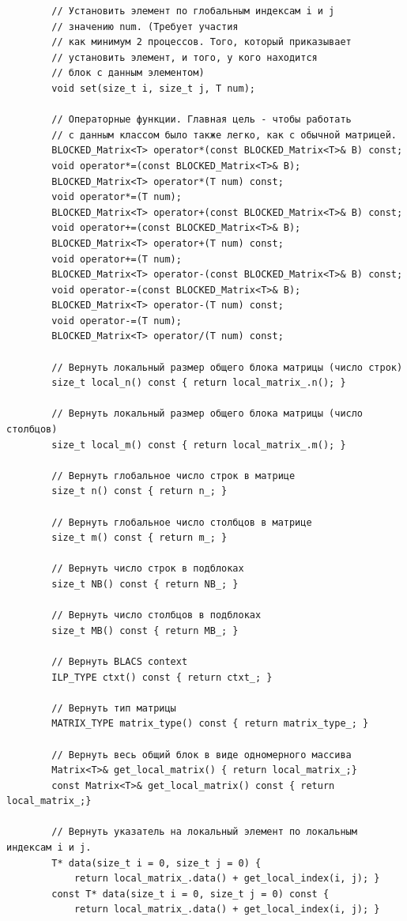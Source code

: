 \documentclass[12pt,fleqn]{article}
\begin{document}
\begin{mdframed}[linecolor=black, topline=true, bottomline=true,
            leftline=false, rightline=false]
\begin{verbatim}
        // Установить элемент по глобальным индексам i и j 
        // значению num. (Требует участия 
        // как минимум 2 процессов. Того, который приказывает 
        // установить элемент, и того, у кого находится 
        // блок с данным элементом)
        void set(size_t i, size_t j, T num);

        // Операторные функции. Главная цель - чтобы работать 
        // с данным классом было также легко, как с обычной матрицей.
        BLOCKED_Matrix<T> operator*(const BLOCKED_Matrix<T>& B) const;
        void operator*=(const BLOCKED_Matrix<T>& B);
        BLOCKED_Matrix<T> operator*(T num) const;
        void operator*=(T num);
        BLOCKED_Matrix<T> operator+(const BLOCKED_Matrix<T>& B) const;
        void operator+=(const BLOCKED_Matrix<T>& B);
        BLOCKED_Matrix<T> operator+(T num) const;
        void operator+=(T num);
        BLOCKED_Matrix<T> operator-(const BLOCKED_Matrix<T>& B) const;
        void operator-=(const BLOCKED_Matrix<T>& B);
        BLOCKED_Matrix<T> operator-(T num) const;
        void operator-=(T num);
        BLOCKED_Matrix<T> operator/(T num) const;
    
        // Вернуть локальный размер общего блока матрицы (число строк)
        size_t local_n() const { return local_matrix_.n(); }

        // Вернуть локальный размер общего блока матрицы (число столбцов)
        size_t local_m() const { return local_matrix_.m(); }

        // Вернуть глобальное число строк в матрице
        size_t n() const { return n_; }

        // Вернуть глобальное число столбцов в матрице
        size_t m() const { return m_; }

        // Вернуть число строк в подблоках
        size_t NB() const { return NB_; }

        // Вернуть число столбцов в подблоках
        size_t MB() const { return MB_; }

        // Вернуть BLACS сontext
        ILP_TYPE ctxt() const { return ctxt_; }

        // Вернуть тип матрицы
        MATRIX_TYPE matrix_type() const { return matrix_type_; }

        // Вернуть весь общий блок в виде одномерного массива
        Matrix<T>& get_local_matrix() { return local_matrix_;}
        const Matrix<T>& get_local_matrix() const { return local_matrix_;}

        // Вернуть указатель на локальный элемент по локальным индексам i и j.
        T* data(size_t i = 0, size_t j = 0) { 
            return local_matrix_.data() + get_local_index(i, j); }
        const T* data(size_t i = 0, size_t j = 0) const { 
            return local_matrix_.data() + get_local_index(i, j); }


\end{verbatim}
\end{mdframed}
\end{document}
